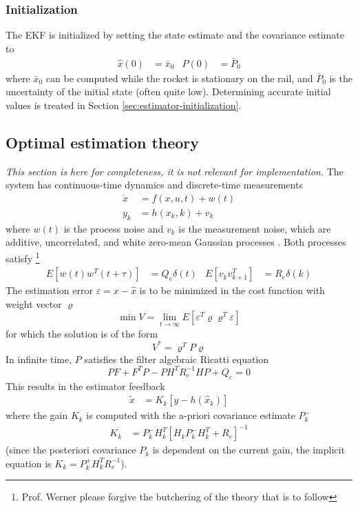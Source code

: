 \subsubsection{Initialization}
The EKF is initialized by setting the state estimate and the covariance estimate to 
\begin{align}
    \hat x (0) &= \bar x_0 & P(0) &= \bar P_0
\end{align}
where $\bar x_0$ can be computed while the rocket is stationary on the rail, and $\bar P_0$ is the uncertainty of the initial state (often quite low).
Determining accurate initial values is treated in Section \ref{sec:estimator-initialization}.  


\subsection{Optimal estimation theory}
\label{sec:estimator_theory}
\textit{This section is here for completeness, it is not relevant for implementation.}
The system has continuous-time dynamics and discrete-time measurements \cite{lewis2008}
\begin{align}
    \dot x &= f(x, u, t) + w(t) \\
    y_k &= h(x_k,k) + v_k
\end{align}
where $w(t)$ is the process noise and $v_k$ is the measurement noise, which are additive, uncorrelated, and white zero-mean Gaussian processes \cite{lewis2008, werner2021b}. 
Both processes satisfy \cite{werner2021b} \footnote{Prof. Werner please forgive the butchering of the theory that is to follow}
\begin{align}
    \label{eq:estimator_theory_noise}
    E\left[ w(t) w^T(t+\tau) \right] &= Q_e \delta(t)
    &
    E\left[ v_{k} v^T_{k+1} \right] &= R_e \delta(k)
\end{align}
The estimation error $\varepsilon = x - \hat x$ is to be minimized in the cost function with weight vector $\varrho$ \cite{werner2021b}
\begin{equation}
    \min V = \lim_{t \to \infty} E\left[ \varepsilon^T \varrho \varrho^T \varepsilon \right]
\end{equation}
for which the solution is of the form \cite{werner2021b}
\begin{equation}
    V^* = \varrho^T P \varrho
\end{equation}
In infinite time, $P$ satisfies the filter algebraic Ricatti equation \cite{werner2021b}
\begin{equation}
    PF + F^TP - PH^TR_e^{-1}HP + Q_e = 0
\end{equation}
This results in the estimator feedback \cite{lewis2008}
\begin{align}
    \tilde x &= K_k \left[ y - h(\hat x_k) \right]
\end{align}
where the gain $K_k$ is computed with the a-priori covariance estimate $P_k^-$
\begin{align}
    K_{k} &= P_{k}^{-} H_k^T \left[ H_k P_{k}^{-} H_k^T + R_e \right]^{-1} 
\end{align}
(since the posteriori covariance $P_k$ is dependent on the current gain, the implicit equation is $K_k = P_k^+ H_k^T R_e^{-1}$).

